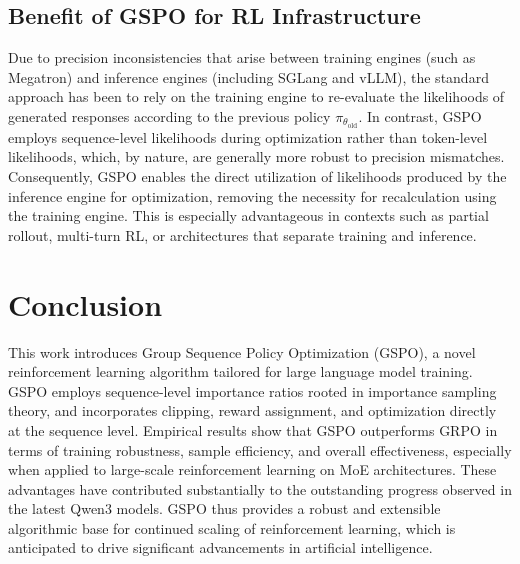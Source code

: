 \subsection{Benefit of GSPO for RL Infrastructure}

Due to precision inconsistencies that arise between training engines (such as Megatron) and inference engines (including SGLang and vLLM), the standard approach has been to rely on the training engine to re-evaluate the likelihoods of generated responses according to the previous policy $\pi_{\theta_\text{old}}$. In contrast, GSPO employs sequence-level likelihoods during optimization rather than token-level likelihoods, which, by nature, are generally more robust to precision mismatches. Consequently, GSPO enables the direct utilization of likelihoods produced by the inference engine for optimization, removing the necessity for recalculation using the training engine. This is especially advantageous in contexts such as partial rollout, multi-turn RL, or architectures that separate training and inference.

\section{Conclusion}

This work introduces Group Sequence Policy Optimization (GSPO), a novel reinforcement learning algorithm tailored for large language model training. GSPO employs sequence-level importance ratios rooted in importance sampling theory, and incorporates clipping, reward assignment, and optimization directly at the sequence level. Empirical results show that GSPO outperforms GRPO in terms of training robustness, sample efficiency, and overall effectiveness, especially when applied to large-scale reinforcement learning on MoE architectures. These advantages have contributed substantially to the outstanding progress observed in the latest Qwen3 models. GSPO thus provides a robust and extensible algorithmic base for continued scaling of reinforcement learning, which is anticipated to drive significant advancements in artificial intelligence.

